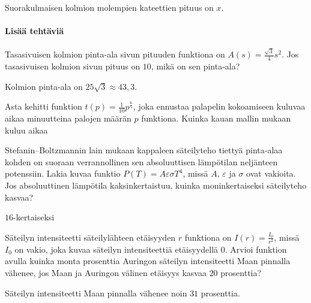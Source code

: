 \begin{tehtavasivu}
\begin{tehtava}
Suorakulmaisen kolmion molempien kateettien pituus on $x$.
\begin{vastaus}
\end{vastaus}
\end{tehtava}

\paragraph*{Lisää tehtäviä}

\begin{tehtava}
Tasasivuisen kolmion pinta-ala sivun pituuden funktiona on $A(s) = \frac{\sqrt{3}}{4}s^{2}$. Jos tasasivuisen kolmion sivun pituus on $10$, mikä on sen pinta-ala?
\begin{vastaus}
Kolmion pinta-ala on $25\sqrt{3}\approx43,3$.
\end{vastaus}
\end{tehtava}

\begin{tehtava}
Asta kehitti funktion $t(p)=\frac{1}{10}p^{\frac{6}{5}}$, joka ennustaa palapelin kokoamiseen kuluvaa aikaa minuutteina palojen määrän $p$ funktiona. Kuinka kauan mallin mukaan kuluu aikaa
\begin{vastaus}
\end{vastaus}
\end{tehtava}

\begin{tehtava}
Stefanin--Boltzmannin lain mukaan kappaleen säteilyteho tiettyä pinta-alaa kohden on suoraan verrannollinen sen absoluuttisen lämpötilan neljänteen potenssiin. Lakia kuvaa funktio $ P(T)=A\varepsilon\sigma T^4 $, missä $A$, $\varepsilon$ ja $\sigma $ ovat vakioita. Jos absoluuttinen lämpötila kaksinkertaistuu, kuinka moninkertaiseksi säteilyteho kasvaa?
\begin{vastaus}
$16$-kertaiseksi
\end{vastaus}
\end{tehtava}

\begin{tehtava}
Säteilyn intensiteetti säteilylähteen etäisyyden $r$ funktiona on $ I(r)=\frac{I_0}{r^{2}}$, missä $I_0$ on vakio, joka kuvaa säteilyn intensiteettiä etäisyydellä $0$. Arvioi funktion avulla kuinka monta prosenttia Auringon säteilyn intensiteetti Maan pinnalla vähenee, jos Maan ja Auringon välinen etäisyys kasvaa $20$ prosenttia?
\begin{vastaus}
Säteilyn intensiteetti Maan pinnalla vähenee noin $31$ prosenttia.
\end{vastaus}
\end{tehtava}

\end{tehtavasivu}
